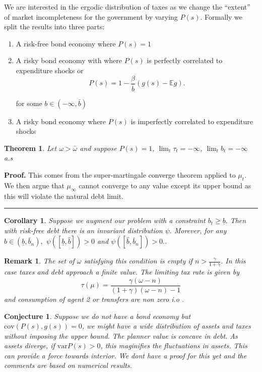 \documentclass[thmsb,11pt]{article}
\newtheorem{theorem}{Theorem}
\newtheorem{conjecture}{Conjecture}
\newtheorem{corollary}{Corollary}
\newtheorem{remark}{Remark}
\newcommand{\var}{\mathrm{var}}
\newcommand{\cov}{\mathrm{cov}}
\newenvironment{proof}[1][Proof]{\noindent \textbf{#1.} }{\  \rule{0.5em}{0.5em}}
\begin{document}
We are interested in the ergodic distribution of taxes as we change the ``extent'' of market incompleteness for the government by varying $P(s)$. Formally we split the results into three parts: 
\begin{enumerate}
 \item A risk-free bond economy where $P(s)=1$
 \item A risky bond economy with where $P(s)$ is perfectly correlated to expenditure shocks or 
\[
	P(s) = 1- \frac{\beta}{\overline b}( g(s) - \mathbb{E} g).
\]  

for some $b\in (-\infty, \bar{b})$

\item  A  risky bond economy where $P(s)$ is imperfectly correlated to expenditure shocks
\end{enumerate}


\begin{theorem}
Let $\omega>\bar{\omega}$ and  suppose $P(s)=1$, $\lim_t \tau_t=-\infty$, $\lim_t b_t=-\infty$     a.s
\end{theorem}
\begin{proof}
This comes from the super-martingale converge theorem applied to $\mu_t$. We then argue that $\mu_{\infty}$ cannot converge to any value except its upper bound as this will violate the natural debt limit.
\end{proof}




\begin{corollary} Suppose we augment our problem with a constraint $b_{t}\geq \underline{b}.$ Then with risk-free debt there is an invariant distribution $\psi .$ Morever, for any $\hat{b}\in \left( \underline{b},\bar{b}_n\right) ,$ $\psi \left( \left[ \underline{b},\hat{b}%
\right] \right) >0$ and $\psi \left( \left[ \hat{b},\bar{b}_n\right] \right)
>0.$. 
\end{corollary}

\begin{remark}
The set of $\omega$ satisfying this condition is empty if  $n>\frac{\gamma}{1+\gamma}$. In this case taxes and debt approach a finite value. The limiting tax rate is given by \[\tau(\mu) = \frac{\gamma(\omega-n)}{(1+\gamma)(\omega-n)-1}\] and  
consumption of agent 2 or transfers are non zero i.o .
\end{remark}

\begin{conjecture} 
Suppose we do not  have a bond economy but $\cov(P(s),g(s))=0$, we might have a wide distribution of assets and taxes without imposing the upper bound. The planner value is concave in debt. As assets diverge, if $\var{P(s)}>0$, this maginifies the fluctuations in assets. This can provide a force towards interior. We dont have a proof for this yet and the comments are based on numerical results.
\end{conjecture}
\end{document}
